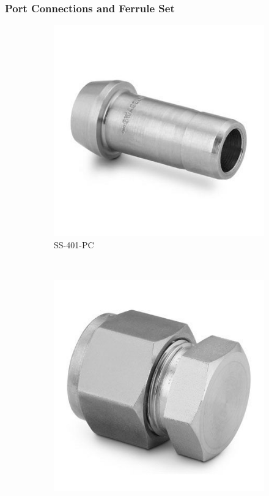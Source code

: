 \subsubsection{Port Connections and Ferrule Set}
\begin{figure}[H]
    \centering
    \begin{subfigure}[b]{0.21\textwidth}
    \centering
    \includegraphics[width=\textwidth]{appendix/img/interfaces/SS-401-PC.jpg}
    \caption{SS-401-PC}
    \end{subfigure}
    ~
    \begin{subfigure}[b]{0.21\textwidth}
    \centering
    \includegraphics[width=\textwidth]{appendix/img/interfaces/SS-400-C.jpg}

\end{subfigure}
\end{figure}
